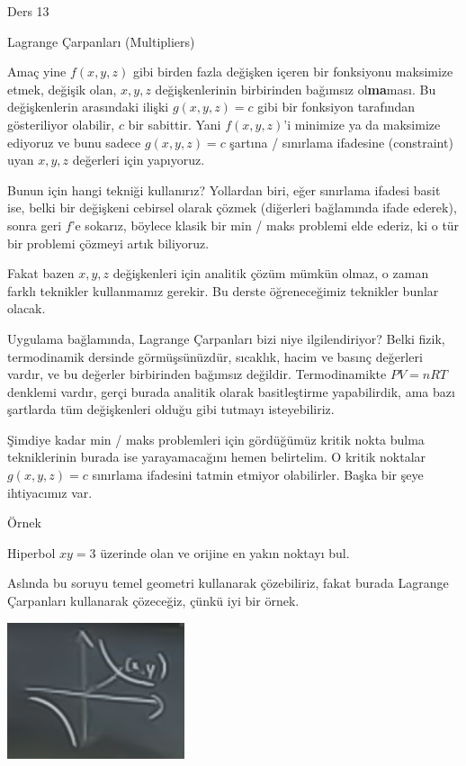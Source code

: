 \documentclass[12pt,fleqn]{article}\usepackage{../../common}
\begin{document}
Ders 13

Lagrange Çarpanları (Multipliers)

Amaç yine $f(x,y,z)$ gibi birden fazla değişken içeren bir fonksiyonu
maksimize etmek, değişik olan, $x,y,z$ değişkenlerinin birbirinden bağımsız
ol\textbf{ma}ması. Bu değişkenlerin arasındaki ilişki $g(x,y,z)=c$ gibi bir
fonksiyon tarafından gösteriliyor olabilir, $c$ bir sabittir. Yani
$f(x,y,z)$'i minimize ya da maksimize ediyoruz ve bunu sadece $g(x,y,z)=c$
şartına / sınırlama ifadesine (constraint) uyan $x,y,z$ değerleri için
yapıyoruz.

Bunun için hangi tekniği kullanırız? Yollardan biri, eğer sınırlama ifadesi
basit ise, belki bir değişkeni cebirsel olarak çözmek (diğerleri
bağlamında ifade ederek), sonra geri $f$'e sokarız, böylece klasik bir min
/ maks problemi elde ederiz, ki o tür bir problemi çözmeyi artık biliyoruz.

Fakat bazen $x,y,z$ değişkenleri için analitik çözüm mümkün olmaz, o zaman
farklı teknikler kullanmamız gerekir. Bu derste öğreneceğimiz teknikler
bunlar olacak. 

Uygulama bağlamında, Lagrange Çarpanları bizi niye ilgilendiriyor? Belki
fizik, termodinamik dersinde görmüşsünüzdür, sıcaklık, hacim ve basınç
değerleri vardır, ve bu değerler birbirinden bağımsız
değildir. Termodinamikte $PV=nRT$ denklemi vardır, gerçi burada analitik
olarak basitleştirme yapabilirdik, ama bazı şartlarda tüm değişkenleri
olduğu gibi tutmayı isteyebiliriz. 

Şimdiye kadar min / maks problemleri için gördüğümüz kritik nokta bulma
tekniklerinin burada ise yarayamacağını hemen belirtelim. O kritik noktalar
$g(x,y,z)=c$ sınırlama ifadesini tatmin etmiyor olabilirler. Başka bir şeye
ihtiyacımız var. 

Örnek

Hiperbol $xy =3$ üzerinde olan ve orijine en yakın noktayı bul. 

Aslında bu soruyu temel geometri kullanarak çözebiliriz, fakat burada
Lagrange Çarpanları kullanarak çözeceğiz, çünkü iyi bir örnek.

\includegraphics[height=4cm]{13_1.png}
\end{document}
